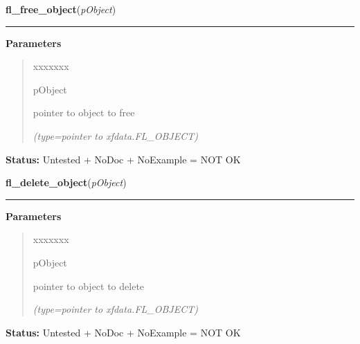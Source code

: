\hspace{.8\funcindent}\begin{boxedminipage}{\funcwidth}

    \raggedright \textbf{fl\_free\_object}(\textit{pObject})

    \vspace{-1.5ex}

    \rule{\textwidth}{0.5\fboxrule}
\setlength{\parskip}{2ex}
\setlength{\parskip}{1ex}
      \textbf{Parameters}
      \vspace{-1ex}

      \begin{quote}
        \begin{Ventry}{xxxxxxx}

          \item[pObject]

          pointer to object to free

            {\it (type=pointer to xfdata.FL\_OBJECT)}

        \end{Ventry}

      \end{quote}

\textbf{Status:} Untested + NoDoc + NoExample = NOT OK



    \end{boxedminipage}

    \label{xformslib:library:fl_delete_object}

    \vspace{0.5ex}

\hspace{.8\funcindent}\begin{boxedminipage}{\funcwidth}

    \raggedright \textbf{fl\_delete\_object}(\textit{pObject})

    \vspace{-1.5ex}

    \rule{\textwidth}{0.5\fboxrule}
\setlength{\parskip}{2ex}
\setlength{\parskip}{1ex}
      \textbf{Parameters}
      \vspace{-1ex}

      \begin{quote}
        \begin{Ventry}{xxxxxxx}

          \item[pObject]

          pointer to object to delete

            {\it (type=pointer to xfdata.FL\_OBJECT)}

        \end{Ventry}

      \end{quote}

\textbf{Status:} Untested + NoDoc + NoExample = NOT OK



    \end{boxedminipage}

